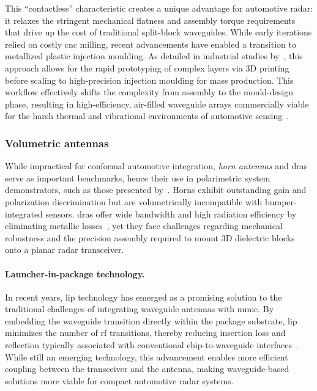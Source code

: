 This \enquote{contactless} characteristic creates a unique advantage for automotive radar: it relaxes the stringent mechanical flatness and assembly torque requirements that drive up the cost of traditional split-block waveguides.
While early iterations relied on costly \gls{cnc} milling, recent advancements have enabled a transition to metallized plastic injection moulding.
As detailed in industrial studies by~\textcite{huegel3DWaveguideMetallized2022,bencivenniHighVolumeManufacturingMetallized2023}, this approach allows for the rapid prototyping of complex layers via 3D printing before scaling to high-precision injection moulding for mass production.
This workflow effectively shifts the complexity from assembly to the mould-design phase, resulting in high-efficiency, air-filled waveguide arrays commercially viable for the harsh thermal and vibrational environments of automotive sensing~\parencite{yongOverviewRecentDevelopment2023}.


\subsubsection{Volumetric antennas}

While impractical for conformal automotive integration, \emph{horn antennas} and \glspl{dra} serve as important benchmarks, hence their use in polarimetric system demonstrators, such as those presented by~\textcite{tintiFullyPolarimetricAutomotive2024,trummerPerformanceAnalysis792017}.
Horns exhibit outstanding gain and polarization discrimination but are volumetrically incompatible with bumper-integrated sensors.
\Glspl{dra} offer wide bandwidth and high radiation efficiency by eliminating metallic losses~\parencite{kishkWidebandTruncatedTetrahedron2003}, yet they face challenges regarding mechanical robustness and the precision assembly required to mount 3D dielectric blocks onto a planar radar transceiver.

\paragraph{Launcher-in-package technology.}
In recent years, \gls{lip} technology has emerged as a promising solution to the traditional challenges of integrating waveguide antennas with \gls{mmic}.
By embedding the waveguide transition directly within the package substrate, \gls{lip} minimizes the number of \gls{rf} transitions, thereby reducing insertion loss and reflection typically associated with conventional chip-to-waveguide interfaces~\parencite{mohammedAdvancementsMmWaveTechnology2024}.
While still an emerging technology, this advancement enables more efficient coupling between the transceiver and the antenna, making waveguide-based solutions more viable for compact automotive radar systems.


